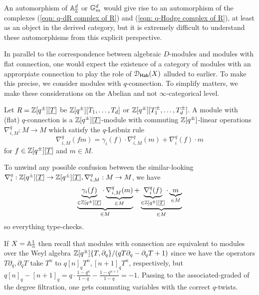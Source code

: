 \begin{remark}
    An automorphism of $\mathbb{A}^{d}_{\mathbb{Z}}$ or $\mathbb{G}_{m}^{d}$ would give rise to an automorphism of the complexes (\ref{eqn: q-dR complex of R}) and (\ref{eqn: q-Hodge complex of R}), at least as an object in the derived category, but it is extremely difficult to understand these automorphisms from this explicit perspective. 
\end{remark}
In parallel to the correspondence between algebraic $D$-modules and modules with flat connection, one would expect the existence of a category of modules with an approrpiate connection to play the role of $\EuScript{D}_{\mathsf{Hab}}(X)$ alluded to earlier. To make this precise, we consider modules with $q$-connection. To simplify matters, we make these considerations on the Abelian and not $\infty$-categorical level. 
\begin{definition}\label{def: q-connections on modules}
    Let $R=\mathbb{Z}[q^{\pm}][\underline{T}]$ be $\mathbb{Z}[q^{\pm}][T_{1},\dots,T_{d}]$ or $\mathbb{Z}[q^{\pm}][T_{1}^{\pm},\dots,T_{d}^{\pm}]$. A module with (flat) $q$-connection is a $\mathbb{Z}[q^{\pm}][\underline{T}]$-module with commuting $\mathbb{Z}[q^{\pm}]$-linear operations $\nabla_{i,M}^{q}:M\to M$ which satisfy the $q$-Leibniz rule 
    $$\nabla_{i,M}^{q}(fm)=\gamma_{i}(f)\cdot\nabla_{i,M}^{q}(m)+\nabla_{i}^{q}(f)\cdot m$$
    for $f\in \mathbb{Z}[q^{\pm}][\underline{T}]$ and $m\in M$.
\end{definition}
\begin{remark}
    To unwind any possible confusion between the similar-looking $\nabla_{i}^{q}:\mathbb{Z}[q^{\pm}][\underline{T}]\to\mathbb{Z}[q^{\pm}][\underline{T}],\nabla_{i,M}^{q}:M\to M$, we have 
    $$\underbrace{\underbrace{\gamma_{i}(f)}_{\in \mathbb{Z}[q^{\pm}][\underline{T}]}\cdot\underbrace{\nabla_{i,M}^{q}(m)}_{\in M}}_{\in M}+\underbrace{\underbrace{\nabla_{i}^{q}(f)}_{\in \mathbb{Z}[q^{\pm}][\underline{T}]}\cdot\underbrace{m}_{\in M}}_{\in M}$$
    so everything type-checks. 
\end{remark}
\begin{example}\label{ex: A1 with Weyl algebra}
    If $X=\mathbb{A}^{1}_{\mathbb{Z}}$ then recall that modules with connection are equivalent to modules over the Weyl algebra $\mathbb{Z}[q^{\pm}]\{T,\partial_{q}\}/(qT\partial_{q}-\partial_{q}T+1)$ since we have the operators $T\partial_{q},\partial_{q}T$ take $T^{n}$ to $q[n]_{q}T^{n},[n+1]_{q}T^{n}$, respectively, but $q[n]_{q}-[n+1]_{q}=q\cdot\frac{1-q^{n}}{1-q}-\frac{1-q^{n+1}}{1-q}=-1$. Passing to the associated-graded of the degree filtration, one gets commuting variables with the correct $q$-twists. 
\end{example}
